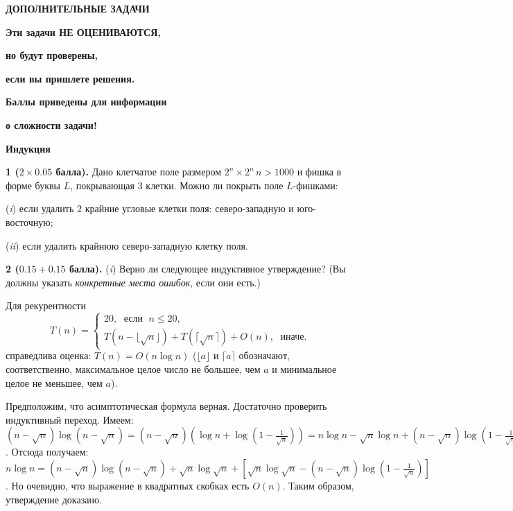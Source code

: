 \documentclass[10pt,twocolumn]{article}
\begin{document}
\centerline{\bf ДОПОЛНИТЕЛЬНЫЕ ЗАДАЧИ}
{\footnotesize
\centerline{\bf Эти задачи НЕ ОЦЕНИВАЮТСЯ,}
\centerline{\bf но будут проверены,}
\centerline{\bf если вы пришлете решения.}
\centerline{\bf Баллы приведены для информации} 
\centerline{\bf о сложности задачи!}

\medskip

\centerline{\bf Индукция }

\smallskip

{\bf 1 ($2\times 0.05$ балла).} Дано клетчатое поле размером $2^n\times 2^n\, n>1000$ и фишка в форме буквы $L$,
покрывающая $3$ клетки. Можно ли покрыть поле $L$-фишками: 

({\em i}) если удалить $2$ крайние угловые клетки поля: северо-западную и юго-восточную;

({\em ii}) если удалить крайнюю северо-западную  клетку поля.

\smallskip


{\bf 2 ($0.15+0.15$ балла).} ({\em i}) 
Верно ли следующее индуктивное утверждение? (Вы должны указать
{\em конкретные места ошибок}, если они
есть.)

Для рекурентности
\begin{displaymath}
T(n)=\left\{
\begin{array}{c}
20, \; \mbox{ если } \; n \leq 20,\\
T(n - \lfloor \sqrt{n} \rfloor) + T(\lceil \sqrt{n} \rceil) + O(n), \;
\mbox{ иначе.}
\end{array}
\right.
\end{displaymath}
справедлива оценка: $T(n) = O(n\log n)$
($\lfloor a \rfloor$ и $\lceil a \rceil$ обозначают, соответственно,
максимальное целое число не большее, чем $a$ и минимальное целое не
меньшее, чем $a$).


Предположим, что асимптотическая формула верная. Достаточно проверить
индуктивный переход.  Имеем: $(n - \sqrt{n})\log(n-\sqrt{n}) =
(n - \sqrt{n})(\log n + \log (1 - \frac{1}{\sqrt{n}})) = n \log n -
\sqrt{n} \log n + (n - \sqrt{n})\log (1- \frac{1}{\sqrt{n}})$.
Отсюда получаем:
$n\log n = (n - \sqrt{n}) \log (n -
\sqrt{n}) + \sqrt{n} \log \sqrt{n} +  [\sqrt{n} \log \sqrt{n} -
(n - \sqrt{n})\log (1- \frac{1}{\sqrt{n}})]$. Но очевидно, что
выражение в квадратных скобках есть $O(n)$. Таким образом,
утверждение доказано.

}
\end{document}
